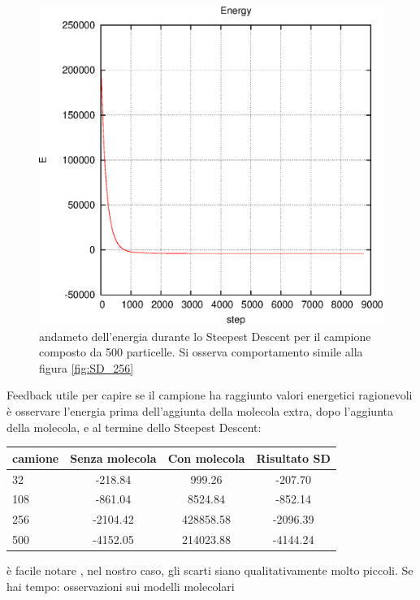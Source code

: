 \documentclass[a4paper,11pt]{article}
\begin{document}
			\begin{figure}[H]
				\centering
				\includegraphics[scale=0.7]{E_SD_500.eps}
				\caption{andameto dell'energia durante lo Steepest Descent per il campione composto da 500 particelle. Si osserva comportamento simile alla figura \ref{fig:SD_256}}
				\label{fig:SD_500}
			\end{figure}
		Feedback utile per capire se il campione ha raggiunto valori energetici ragionevoli è osservare l'energia prima dell'aggiunta della molecola extra, dopo l'aggiunta della molecola, e al termine dello Steepest Descent:
		\begin{table}[H]
			\centering
			\begin{tabular}{l|ccc}
			\hline
		
			\hline
			\textbf{camione} & \textbf{Senza molecola} & \textbf{Con molecola} & \textbf{Risultato SD} \\
			\hline
				32	 & -218.84 	 & 999.26 	& 	-207.70 \\
				108 & 	-861.04	 & 	8524.84 & 	-852.14 \\
				256 & 	-2104.42 & 	428858.58 	& -2096.39 \\
				500 & 	-4152.05 & 	214023.88	& -4144.24 \\
			\hline
		
			\hline
			\end{tabular}
		\end{table}
		è facile notare , nel nostro caso, gli scarti siano qualitativamente molto piccoli.
		Se hai tempo: osservazioni sui modelli molecolari
	\newpage
\end{document}
